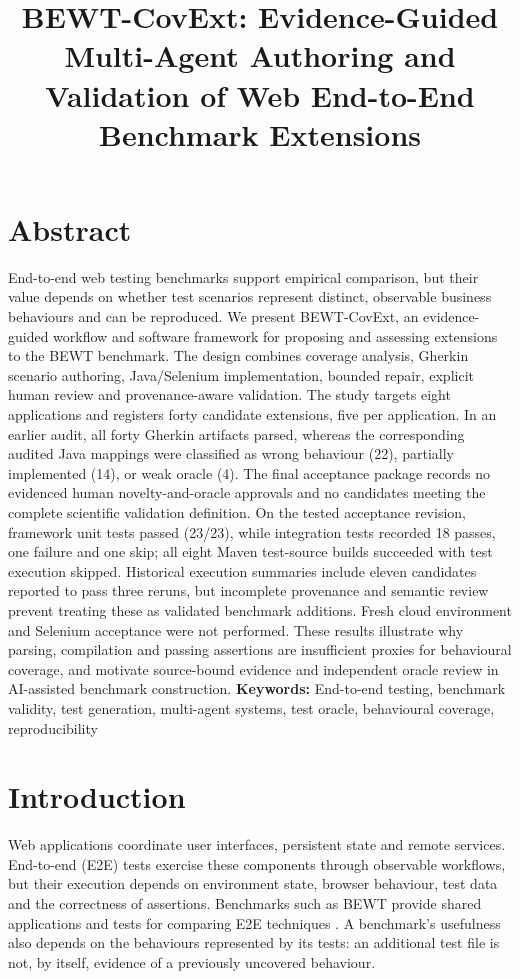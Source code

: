 \documentclass[pdflatex,sn-mathphys-num]{sn-jnl}
\begin{document}
\title[BEWT-CovExt]{BEWT-CovExt: Evidence-Guided Multi-Agent Authoring and Validation of Web End-to-End Benchmark Extensions}
\author*[1]{ }

\maketitle
\section*{Abstract}
End-to-end web testing benchmarks support empirical comparison, but their value depends on whether test scenarios represent distinct, observable business behaviours and can be reproduced. We present BEWT-CovExt, an evidence-guided workflow and software framework for proposing and assessing extensions to the BEWT benchmark. The design combines coverage analysis, Gherkin scenario authoring, Java/Selenium implementation, bounded repair, explicit human review and provenance-aware validation. The study targets eight applications and registers forty candidate extensions, five per application. In an earlier audit, all forty Gherkin artifacts parsed, whereas the corresponding audited Java mappings were classified as wrong behaviour (22), partially implemented (14), or weak oracle (4). The final acceptance package records no evidenced human novelty-and-oracle approvals and no candidates meeting the complete scientific validation definition. On the tested acceptance revision, framework unit tests passed (23/23), while integration tests recorded 18 passes, one failure and one skip; all eight Maven test-source builds succeeded with test execution skipped. Historical execution summaries include eleven candidates reported to pass three reruns, but incomplete provenance and semantic review prevent treating these as validated benchmark additions. Fresh cloud environment and Selenium acceptance were not performed. These results illustrate why parsing, compilation and passing assertions are insufficient proxies for behavioural coverage, and motivate source-bound evidence and independent oracle review in AI-assisted benchmark construction.
\textbf{Keywords:} End-to-end testing, benchmark validity, test generation, multi-agent systems, test oracle, behavioural coverage, reproducibility


\section{Introduction}\label{sec:intro}
Web applications coordinate user interfaces, persistent state and remote services. End-to-end (E2E) tests exercise these components through observable workflows, but their execution depends on environment state, browser behaviour, test data and the correctness of assertions. Benchmarks such as BEWT provide shared applications and tests for comparing E2E techniques \cite{olianas2026bewt}. A benchmark's usefulness also depends on the behaviours represented by its tests: an additional test file is not, by itself, evidence of a previously uncovered behaviour.
\end{document}
